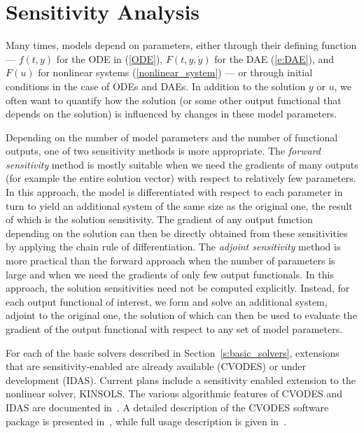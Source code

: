 \section{Sensitivity Analysis}\label{s:sensitivity_analysis}

Many times, models depend on parameters, either through their defining
function --- $f(t,y)$ for the ODE in (\ref{ODE}), $F(t,y,{\dot y})$ for the DAE
(\ref{e:DAE}), and $F(u)$ for nonlinear systems (\ref{nonlinear_system}) 
--- or through initial conditions in the case of ODEs and DAEs. 
In addition to the solution $y$ or $u$, we often want to quantify how 
the solution (or some other output functional that depends on the solution) 
is influenced by changes in these model parameters.

Depending on the number of model parameters and the
number of functional outputs, one of two sensitivity methods
is more appropriate. 
%
The {\em forward sensitivity} method is mostly suitable when we need 
the gradients of many outputs (for example the entire solution vector) 
with respect to relatively few parameters.
In this approach, the model is differentiated with respect to each 
parameter in turn to yield an additional system of the same size as
the original one, the result of which is the solution sensitivity.
The gradient of any output function depending on the solution can
then be directly obtained from these sensitivities by applying the
chain rule of differentiation.
%
The {\em adjoint sensitivity} method is more practical than
the forward approach when the number of parameters is large and
when we need the gradients of only few output functionals.
In this approach, the solution sensitivities need not be computed
explicitly. Instead, for each output functional of interest, we form
and solve an additional system, adjoint to the original one, the 
solution of which can then be used to evaluate the gradient of the
output functional with respect to any set of model parameters.

For each of the basic solvers described in Section~\ref{s:basic_solvers},
extensions that are sensitivity-enabled are already available (CVODES)
or under development (IDAS). Current plans include a sensitivity
enabled extension to the nonlinear solver, KINSOLS.
The various algorithmic features of CVODES and IDAS are documented 
in~\cite{CLPS:03}. A detailed description of the CVODES software package 
is presented in~\cite{SeHi:03}, while full usage description is given
in~\cite{HiSe:02}.
%

